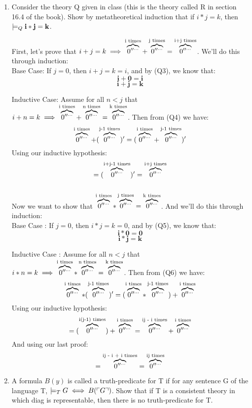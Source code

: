 \begin{enumerate}
  \item
    \begin{question}
      Consider the theory Q given in class (this is the theory called R in section 16.4 of the book). Show by metatheoretical induction that if $i*j = k$, then $\tarski_Q \textbf{i}*\textbf{j} = \textbf{k}$.
    \end{question}
    First, let's prove that $i+j=k \implies \s{i} + \s{j} = \s{i+j}$. We'll do this through induction:\\

    Base Case: If $j=0$, then $i+j=k=i$, and by (Q3), we know that:
    $$\textbf{i} + \textbf{0} = \textbf{i}$$
    $$\textbf{i} + \textbf{j} = \textbf{k}$$

    Inductive Case: Assume for all $n < j$ that $i+n = k \implies \s{i} + \s{n} = \s{k}$. Then from (Q4) we have:
    $$\s{i} + (\s{j-1})' = (\s{i} + \s{j-1})'$$
    Using our inductive hypothesis:
    $$= (\s{i+j-1})' = \s{i+j}$$\\

    Now we want to show that $\s{i} * \s{j} = \s{k}$. And we'll do this through induction:\\




    Base Case : If $j=0$, then $i*j = k = 0$, and by (Q5), we know that:
    $$\textbf{i} * \textbf{0} = \textbf{0}$$
    $$\textbf{i} * \textbf{j} = \textbf{k}$$

    Inductive Case : Assume for all $n < j$ that $i*n = k \implies \s{i} * \s{n} = \s{k}$. Then from (Q6) we have:
    $$\s{i} * (\s{j-1})' = (\s{i} * \s{j-1}) + \s{i}$$
    Using our inductive hypothesis:
    $$= (\s{i(j-1)}) + \s{i} = \s{ij - i} + \s{i}$$
    And using our last proof:
    $$= \s{ij - i + i} = \s{ij}$$

    \pagebreak
  \item
    \begin{question}
      A formula $B(y)$ is called a truth-predicate for T if for any sentence G of the language T, $\tarski_T G \iff B(\brak{G})$. Show that if T is a consistent theory in which diag is representable, then there is no truth-predicate for T.
    \end{question}


\end{enumerate}
